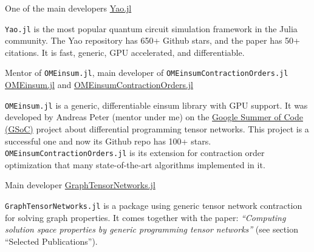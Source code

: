 \documentclass[11pt, a4paper]{awesome-cv}
\begin{document}
\begin{cventries}
  \cventry
    {One of the main developers} %
    {\href{https://github.com/QuantumBFS/Yao.jl}{Yao.jl}} %
    {} %
    {} %
    {
      \begin{cvitems} %
          {\texttt{Yao.jl} is the most popular quantum circuit simulation framework in the Julia community.
          The Yao repository has 650+ Github stars, and the paper has 50+ citations.
          It is fast, generic, GPU accelerated, and differentiable.
          }
      \end{cvitems}
    }
  \cventry
    {Mentor of \texttt{OMEinsum.jl}, main developer of \texttt{OMEinsumContractionOrders.jl}} %
    {\href{https://github.com/under-Peter/OMEinsum.jl}{OMEinsum.jl} and \href{OMEinsumContractionOrders.jl}{OMEinsumContractionOrders.jl}} %
    {}{}
    {
      \begin{cvitems} %
          {\texttt{OMEinsum.jl} is a generic, differentiable einsum library with GPU support. It was developed by Andreas Peter (mentor under me) on the \href{https://summerofcode.withgoogle.com/}{Google Summer of Code (GSoC)} project about differential programming tensor networks. This project is a successful one and now its Github repo has 100+ stars.
          \texttt{OMEinsumContractionOrders.jl} is its extension for contraction order optimization that many state-of-the-art algorithms implemented in it.}
      \end{cvitems}
    }

  \cventry
    {Main developer}
    {\href{https://github.com/Happy-Diode/GraphTensorNetworks.jl}{GraphTensorNetworks.jl}} %
    {}{}
    {
      \begin{cvitems} %
          {\texttt{GraphTensorNetworks.jl} is a package using generic tensor network contraction for solving graph properties. It comes together with the paper: \textit{``Computing solution space properties by generic programming tensor networks''} (see section ``Selected Publications'').}
      \end{cvitems}
    }

\end{cventries}
\end{document}
